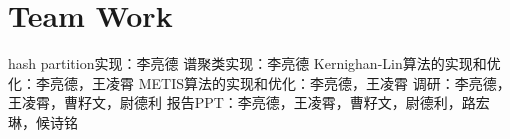 \section{Team Work}
hash partition实现：李亮德
谱聚类实现：李亮德
Kernighan-Lin算法的实现和优化：李亮德，王凌霄
METIS算法的实现和优化：李亮德，王凌霄
调研：李亮德，王凌霄，曹籽文，尉德利
报告PPT：李亮德，王凌霄，曹籽文，尉德利，路宏琳，候诗铭
